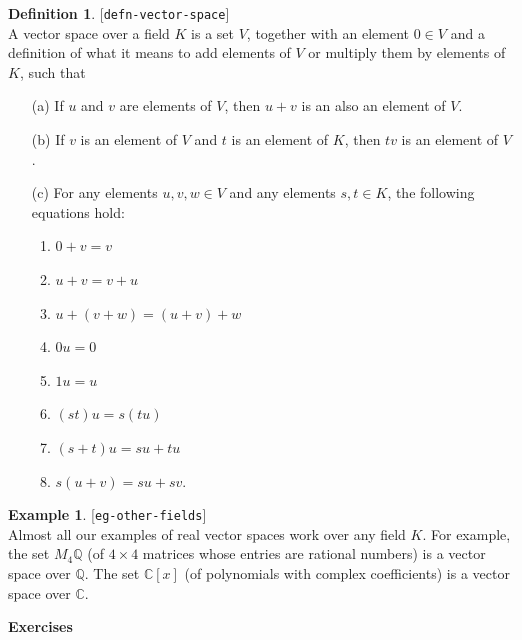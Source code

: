 \documentclass{amsart}
\newcommand{\lbl}[1]{\label{#1}\textup{[\texttt{#1}]}\ \\}
\newcommand{\lbl}{\label}
\newcommand{\C}         {{\mathbb{C}}}
\newcommand{\Q}         {{\mathbb{Q}}}
\newcommand{\tm}        {\times}
\renewcommand{\:}       {\colon}
\theoremstyle{definition}
\newtheorem{definition}[theorem]{Definition}
\newtheorem{example}[theorem]{Example}
\begin{document}
\begin{definition}\lbl{defn-vector-space}
 A vector space over a field $K$ is a set $V$, together with
 an element $0\in V$ and a definition of what it means to
 add elements of $V$ or multiply them by elements of $K$,
 such that
 \begin{itemize}
  \item[(a)] If $u$ and $v$ are elements of $V$, then $u+v$ is an
   also an element of $V$.
  \item[(b)] If $v$ is an element of $V$ and $t$ is an
   element of $K$, then $tv$ is an element of $V$.
  \item[(c)] For any elements $u,v,w\in V$ and any elements
   $s,t\in K$, the following equations hold:
    \begin{enumerate}
     \item $0+v=v$
     \item $u+v=v+u$
     \item $u+(v+w)=(u+v)+w$
     \item $0u=0$
     \item $1u=u$
     \item $(st)u=s(tu)$
     \item $(s+t)u=su+tu$
     \item $s(u+v)=su+sv$.
    \end{enumerate}
 \end{itemize}  
\end{definition}
\begin{example}\lbl{eg-other-fields}
 Almost all our examples of real vector spaces work over any
 field $K$.  For example, the set $M_4\Q$ (of $4\tm 4$
 matrices whose entries are rational numbers) is a vector
 space over $\Q$.  The set $\C[x]$ (of polynomials with
 complex coefficients) is a vector space over $\C$.
\end{example}



\begin{center}
 \Large \textbf{Exercises}
\end{center}
\end{document}
